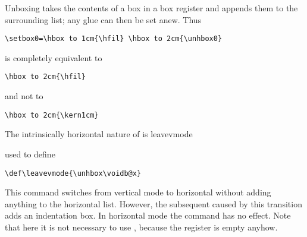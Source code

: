 \documentclass{book}
\begin{document}
Unboxing takes the contents of a box in a box register and appends
them to the surrounding list; any glue can then
be set anew. Thus
\begin{verbatim}
\setbox0=\hbox to 1cm{\hfil} \hbox to 2cm{\unhbox0}
\end{verbatim}
is completely equivalent to
\begin{verbatim}
\hbox to 2cm{\hfil}
\end{verbatim}
and not to
\begin{verbatim}
\hbox to 2cm{\kern1cm}
\end{verbatim}

The intrinsically horizontal nature of  is
\cstoidx leavevmode\par
used to define
\begin{verbatim}
\def\leavevmode{\unhbox\voidb@x}
\end{verbatim}
This command switches from vertical mode to horizontal without
adding anything to the horizontal list.
However, the subsequent  caused by this transition
adds an indentation box.
In horizontal mode the  command has no effect.
Note that here it is not necessary to use ,
because the register is empty anyhow.
\end{document}
